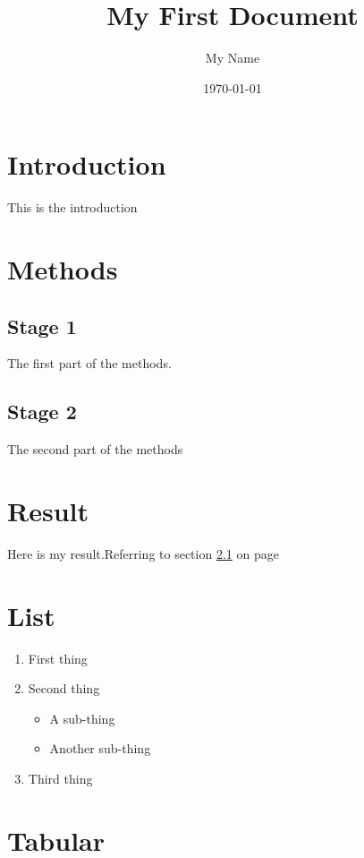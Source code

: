 \documentclass[a4paper,12pt]{article}
\begin{document}
	
\title{My First Document}
\author{My Name}
\date{\today}
\maketitle
{}
\tableofcontents
\newpage

	
\section{Introduction}
This is the introduction

\section{Methods}

\subsection{Stage 1}
\label{sec1}
The first part of the methods.  


\subsection{Stage 2}
The second part of the methods\\ %


\section{Result}
Here is my result.Referring to section \ref{sec1} on page \pageref{sec1}
	
\section{List}
\begin{enumerate}
	\item First thing
	\item Second thing
	\begin{itemize}
		\item A sub-thing
		\item Another sub-thing
	\end{itemize}
	\item Third thing
\end{enumerate}

\section{Tabular}
\end{document}
